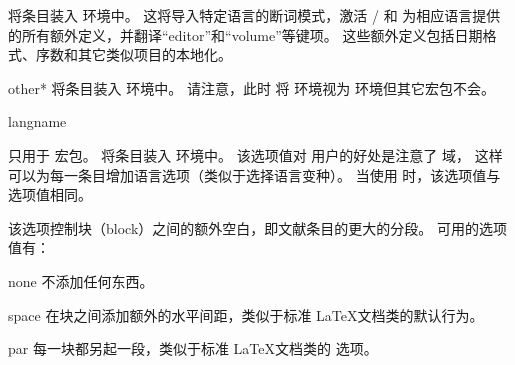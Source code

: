 \begin{optionlist}
\begin{valuelist}
将条目装入  环境中。
这将导入特定语言的断词模式，激活 / 和 \biblatex 为相应语言提供的所有额外定义，并翻译“editor”和“volume”等键项。
这些额外定义包括日期格式、序数和其它类似项目的本地化。

\item[other*]
将条目装入  环境中。
请注意，此时 \biblatex 将  环境视为  环境但其它宏包不会。

\item[langname]

只用于  宏包。
将条目装入  环境中。
该选项值对  用户的好处是注意了  域，
这样可以为每一条目增加语言选项（类似于选择语言变种）。
当使用  时，该选项值与  选项值相同。

\end{valuelist}


该选项控制块（block）之间的额外空白，即文献条目的更大的分段。
可用的选项值有：

\begin{valuelist}

\item[none] %
不添加任何东西。

\item[space] %
在块之间添加额外的水平间距，类似于标准 \LaTeX 文档类的默认行为。

\item[par] %
每一块都另起一段，类似于标准 \LaTeX 文档类的  选项。


\end{valuelist}
\end{optionlist}
